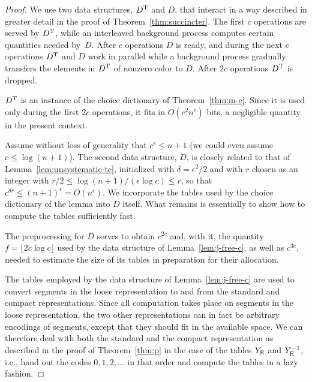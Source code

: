\documentclass[envcountsame,envcountsect,undated,nolinenumbers]{lnthi}
\def\Fpasteinsection#1{#1
}
\def\Tfloor#1{\lfloor #1\rfloor}
\begin{document}
\Fpasteinsection{\unsystematic}

\begin{proof}
We use two data structures, $D^{\mbox{\scriptsize T}}$ and $D$,
that interact in a way described in greater
detail in the proof of Theorem~\ref{thm:succincter}.
The first $c$ operations are served by $D^{\mbox{\scriptsize T}}$,
while an interleaved background process computes
certain quantities needed by~$D$.
After $c$ operations $D$
is ready,
and during the next $c$ operations $D^{\mbox{\scriptsize T}}$
and $D$ work in parallel while a background
process gradually transfers the elements in
$D^{\mbox{\scriptsize T}}$ of nonzero color to $D$.
After $2 c$ operations $D^{\mbox{\scriptsize T}}$ is dropped.

$D^{\mbox{\scriptsize T}}$ is an instance of the
choice dictionary of Theorem~\ref{thm:m-c}.
Since it is used only
during the first $2 c$ operations,
it fits in $O(c^2 n^\epsilon)$ bits,
a negligible quantity in the present context.

Assume without loss of generality that
$c^\epsilon\le n+1$ (we could even assume $c\le\log(n+1)$).
The second data structure, $D$, is closely
related to that of Lemma~\ref{lem:unsystematic-tc},
initialized
with $\delta=\epsilon^2/2$ and
with $r$ chosen
as an integer with
${r/2}\le{{\log(n+1)}/{(\epsilon \log c)}}\le r$,
so that $c^{\delta r}\le (n+1)^\epsilon=O(n^\epsilon)$.
We incorporate the tables used by the choice
dictionary of the lemma
into $D$ itself.
What remains is essentially to show
how to compute the tables sufficiently fast.

The preprocessing for $D$ serves to obtain
$c^{2 c}$ and, with it,
the quantity $f=\Tfloor{2 c\log c}$
used by the data structure of
Lemma~\ref{lem:j-free-c},
as well as $c^{3 c}$, needed
to estimate the size of its tables in
preparation for their allocation.

The tables employed by the data structure of
Lemma~\ref{lem:j-free-c} are used to convert segments
in the loose representation to and from the standard and
compact representations.
Since all computation takes place on segments
in the loose representation, the two other representations can
in fact be arbitrary encodings of segments,
except that they should fit in the available space.
We can therefore deal with both the standard and
the compact representation as described in the
proof of Theorem~\ref{thm:p} in the case of the
tables $Y_{\mbox{\scriptsize E}}$ and $Y^{-1}_{\mbox{\scriptsize E}}$, i.e., hand
out the codes $0,1,2,\ldots$ in that order and
compute the tables in a lazy fashion.


\end{proof}
\end{document}
